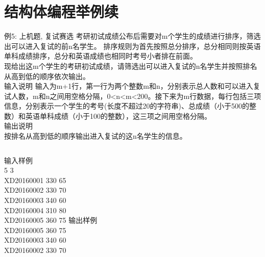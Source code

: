 
\section{结构体编程举例续}

\begin{frame}{例5: 上机题, 复试赛选}
考研初试成绩公布后需要对m个学生的成绩进行排序，筛选出可以进入复试的前n名学生。
排序规则为首先按照总分排序，总分相同则按英语单科成绩排序，总分和英语成绩也相同时考号小者排在前面。\\
现给出这m个学生的考研初试成绩，请筛选出可以进入复试的n名学生并按照排名从高到低的顺序依次输出。\\
输入说明	
输入为m+1行，第一行为两个整数m和n，分别表示总人数和可以进入复试人数，m和n之间用空格分隔，0<n<m<200。接下来为m行数据，每行包括三项信息，分别表示一个学生的考号(长度不超过20的字符串)、总成绩（小于500的整数）和英语单科成绩（小于100的整数），这三项之间用空格分隔。\\
输出说明\\	
按排名从高到低的顺序输出进入复试的这n名学生的信息。\\
\begin{columns}[T]
输入样例\\	
5 3\\
XD20160001 330 65\\
XD20160002 330 70\\
XD20160003 340 60\\
XD20160004 310 80\\
XD20160005 360 75
输出样例\\	
XD20160005 360 75\\
XD20160003 340 60\\
XD20160002 330 70
\end{columns}
\medskip
\end{frame}

